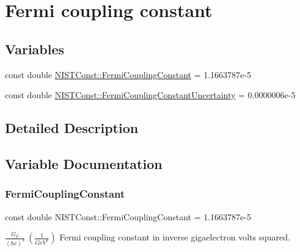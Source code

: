 \hypertarget{group___fermi_coupling_constant}{}\section{Fermi coupling constant}
\label{group___fermi_coupling_constant}
\subsection*{Variables}
\begin{DoxyCompactItemize}
\item 
const double \hyperlink{group___fermi_coupling_constant_ga0348e7c9835697c05fa7f68029bfb15a}{N\+I\+S\+T\+Const\+::\+Fermi\+Coupling\+Constant} = 1.\+1663787e-\/5
\item 
const double \hyperlink{group___fermi_coupling_constant_gaf419e34a813e9b1aeeddc54937905aa0}{N\+I\+S\+T\+Const\+::\+Fermi\+Coupling\+Constant\+Uncertainty} = 0.\+0000006e-\/5
\end{DoxyCompactItemize}


\subsection{Detailed Description}


\subsection{Variable Documentation}
\mbox{\label{group___fermi_coupling_constant_ga0348e7c9835697c05fa7f68029bfb15a}} 
\subsubsection{\texorpdfstring{Fermi\+Coupling\+Constant}{FermiCouplingConstant}}
{\footnotesize\ttfamily const double N\+I\+S\+T\+Const\+::\+Fermi\+Coupling\+Constant = 1.\+1663787e-\/5}

$\frac{G_F}{(\hbar c)^3} \ (\frac{1}{GeV^2})$ Fermi coupling constant in inverse gigaelectron volts squared. \mbox{\label{group___fermi_coupling_constant_gaf419e34a813e9b1aeeddc54937905aa0}} 
